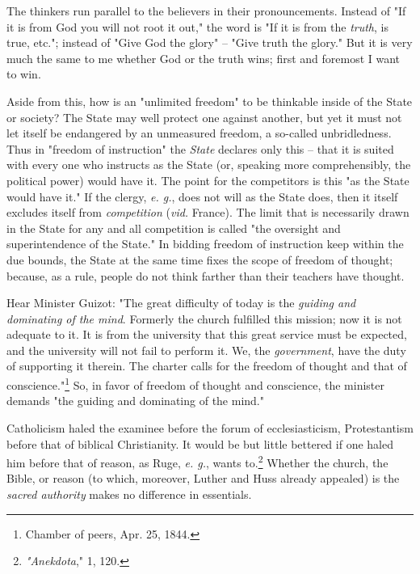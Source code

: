 The thinkers run parallel to the believers in their pronouncements. Instead of 
"{}If it is from God you will not root it out,"{} the word is "{}If it is from 
the \textit{truth}, is true, etc."{}; instead of "{}Give God the glory"{} -- 
"{}Give truth the glory."{} But it is very much the same to me whether God or 
the truth wins; first and foremost I want to win.

Aside from this, how is an "{}unlimited freedom"{} to be thinkable inside of 
the State or society? The State may well protect one against another, but yet 
it must not let itself be endangered by an unmeasured freedom, a so-called 
unbridledness. Thus in "{}freedom of instruction"{} the \textit{State} 
declares only this -- that it is suited with every one who instructs as the 
State (or, speaking more comprehensibly, the political power) would have it. 
The point for the competitors is this "{}as the State would have it."{} If the 
clergy, \textit{e. g.}, does not will as the State does, then it itself 
excludes itself from \textit{competition} (\textit{vid.} France). The limit 
that is necessarily drawn in the State for any and all competition is called 
"{}the oversight and superintendence of the State."{} In bidding freedom of 
instruction keep within the due bounds, the State at the same time fixes the 
scope of freedom of thought; because, as a rule, people do not think farther 
than their teachers have thought.

Hear Minister Guizot: "{}The great difficulty of today is the \textit{guiding 
and dominating of the mind}. Formerly the church fulfilled this mission; now 
it is not adequate to it. It is from the university that this great service 
must be expected, and the university will not fail to perform it. We, the 
\textit{government}, have the duty of supporting it therein. The charter calls 
for the freedom of thought and that of conscience."{}\footnote{Chamber of 
peers, Apr. 25, 1844.} So, in favor of freedom of thought and conscience, the 
minister demands "{}the guiding and dominating of the mind."{}

Catholicism haled the examinee before the forum of ecclesiasticism, 
Protestantism before that of biblical Christianity. It would be but little 
bettered if one haled him before that of reason, as Ruge, \textit{e. g.}, 
wants to.\footnote{\textit{"{}Anekdota},"{} 1, 120.} Whether the church, the 
Bible, or reason (to which, moreover, Luther and Huss already appealed) is the 
\textit{sacred authority} makes no difference in essentials.

